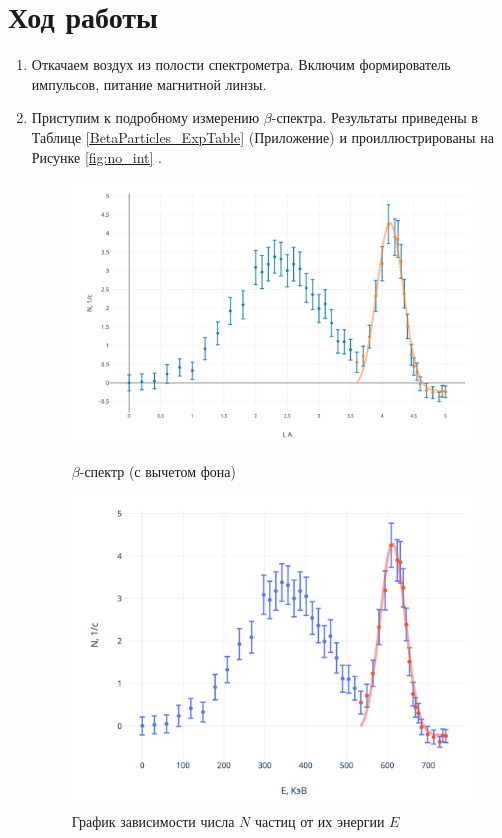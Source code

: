 \documentclass{article}
\begin{document}
\section{Ход работы}
	\begin{enumerate}
		\item Откачаем воздух из полости спектрометра. Включим формирователь импульсов, питание магнитной линзы.	
		\item Приступим к подробному измерению $\beta$-спектра. Результаты приведены в Таблице \ref{BetaParticles_ExpTable} (Приложение) и проиллюстрированы на Рисунке \ref{fig:no_int} . 


\begin{figure}[h!]
\begin{center}
\begin{minipage}[h!]{0.45\linewidth}
\includegraphics[scale = 0.37]{N_I.png}
\caption{$\beta$-спектр (с вычетом фона)}
\label{fig:no_int}
\end{minipage}
\hfill
\begin{minipage}[h]{0.45\linewidth}
\includegraphics[scale = 0.4]{N_E.png}
			\caption{График зависимости числа $N$ частиц от их энергии $E$}
\label{fig:no_int1}
\end{minipage}
\end{center}
\end{figure}








\end{enumerate}
\end{document}
